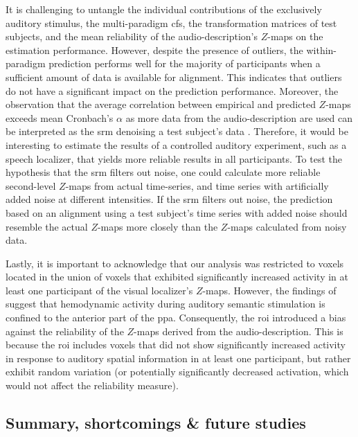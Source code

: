 %
It is challenging to untangle the individual contributions of the exclusively
auditory stimulus, the multi-paradigm \ac{cfs}, the transformation matrices of
test subjects, and the mean reliability of the audio-description's $Z$-maps on
the estimation performance.
%
However, despite the presence of outliers, the within-paradigm prediction
performs well for the majority of participants when a sufficient amount of data
is available for alignment.
%
This indicates that outliers do not have a significant impact on the prediction
performance.
%
Moreover, the observation that the average correlation between empirical and
predicted $Z$-maps exceeds mean Cronbach's $\alpha$ as more data from the
audio-description are used can be interpreted as the \ac{srm} denoising a test
subject's data \citep[cf.][]{chen2015reduced}.
%
Therefore, it would be interesting to estimate the results of a controlled
auditory experiment, such as a speech localizer, that yields more reliable
results in all participants.
%
To test the hypothesis that the \ac{srm} filters out noise, one could calculate
more reliable second-level $Z$-maps from actual time-series, and time series
with artificially added noise at different intensities.
%
If the \ac{srm} filters out noise, the prediction based on an alignment using a
test subject's time series with added noise should resemble the actual $Z$-maps
more closely than the $Z$-maps calculated from noisy data.


%
Lastly, it is important to acknowledge that our analysis was restricted to
voxels located in the union of voxels that exhibited significantly increased
activity in at least one participant of the visual localizer's $Z$-maps.
%
However, the findings of \citet{haeusler2022processing} suggest that hemodynamic
activity during auditory semantic stimulation is confined to the anterior part
of the \ac{ppa}.
%
Consequently, the \ac{roi} introduced a bias against the reliability of the
$Z$-maps derived from the audio-description.
%
This is because the \ac{roi} includes voxels that did not show significantly
increased activity in response to auditory spatial information in at least one
participant, but rather exhibit random variation (or potentially significantly
decreased activation, which would not affect the reliability measure).


\subsection{Summary, shortcomings \& future studies}

